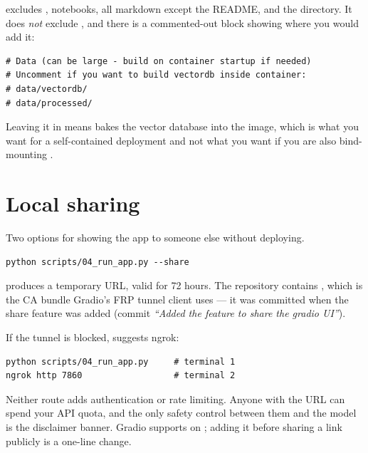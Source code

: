  excludes , notebooks, all markdown except the README, and the  directory. It does \emph{not} exclude , and there is a commented-out block showing where you would add it:

\begin{lstlisting}[style=shell]
# Data (can be large - build on container startup if needed)
# Uncomment if you want to build vectordb inside container:
# data/vectordb/
# data/processed/
\end{lstlisting}

Leaving it in means  bakes the vector database into the image, which is what you want for a self-contained deployment and not what you want if you are also bind-mounting .

\section{Local sharing}

Two options for showing the app to someone else without deploying.

\begin{lstlisting}[style=shell]
python scripts/04_run_app.py --share
\end{lstlisting}

produces a temporary  URL, valid for 72 hours. The repository contains , which is the CA bundle Gradio's FRP tunnel client uses --- it was committed when the share feature was added (commit \emph{``Added the feature to share the gradio UI''}).

If the tunnel is blocked,  suggests ngrok:

\begin{lstlisting}[style=shell]
python scripts/04_run_app.py     # terminal 1
ngrok http 7860                  # terminal 2
\end{lstlisting}

\begin{warn}[title={A public link exposes an unauthenticated medical chatbot}]
Neither route adds authentication or rate limiting. Anyone with the URL can spend your API quota, and the only safety control between them and the model is the disclaimer banner. Gradio supports  on ; adding it before sharing a link publicly is a one-line change.
\end{warn}

